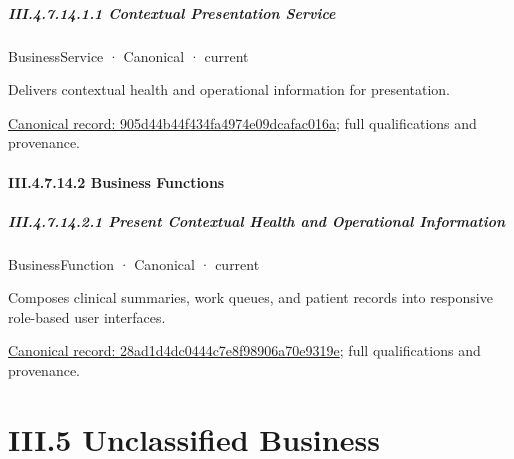 \paragraph*{III.4.7.14.1.1 Contextual Presentation Service}
\label{navigation:III.4.7.14.1.1}

\label{element:905d44b44f434fa4974e09dcafac016a}
{\small BusinessService · Canonical · current}\par

Delivers contextual health and operational information for presentation.


{\footnotesize \href{../../../../continuum/business/business-service/905d44b44f434fa4974e09dcafac016a.md}{Canonical record: 905d44b44f434fa4974e09dcafac016a}; full qualifications and provenance.}\par
\subsubsection*{III.4.7.14.2 Business Functions}
\label{navigation:III.4.7.14.2}

\paragraph*{III.4.7.14.2.1 Present Contextual Health and Operational Information}
\label{navigation:III.4.7.14.2.1}

\label{element:28ad1d4dc0444c7e8f98906a70e9319e}
{\small BusinessFunction · Canonical · current}\par

Composes clinical summaries, work queues, and patient records into responsive role-based user interfaces.


{\footnotesize \href{../../../../continuum/business/business-function/28ad1d4dc0444c7e8f98906a70e9319e.md}{Canonical record: 28ad1d4dc0444c7e8f98906a70e9319e}; full qualifications and provenance.}\par
\chapter*{III.5 Unclassified Business}
\label{navigation:III.5}

